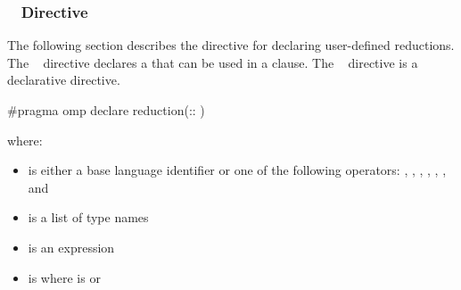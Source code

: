 \subsubsection{~ Directive}
\label{subsubsec:declare reduction Directive}
\summary
The following section describes the directive for declaring user-defined 
reductions. The ~ directive declares a 
 that can be used in a  clause. 
The ~ directive is a declarative directive.

\syntax
\begin{cspecific}
\begin{ompcPragma}
#pragma omp declare reduction(::
)
\end{ompcPragma}

where:

\begin{itemize}
\item {} is either a base language identifier or one of 
      the following operators: \code{+}, \code{-}, \code{*}, \code{&}, \code{|},
      \code{^}, \code{&&} and \code{||}
\item {} is a list of type names
\item {} is an expression
\item {} is \code{)}
      where  is\linebreak
       or \code{(}\code{)}
\end{itemize}
\end{cspecific}

